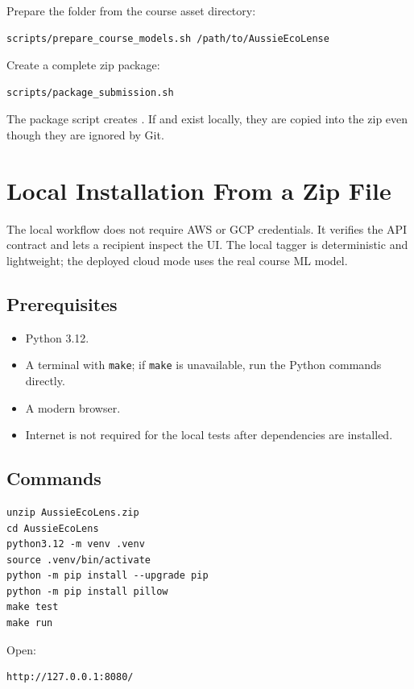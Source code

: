 \documentclass[12pt,a4paper]{article}
\begin{document}
Prepare the folder from the course asset directory:

\begin{verbatim}
scripts/prepare_course_models.sh /path/to/AussieEcoLense
\end{verbatim}

Create a complete zip package:

\begin{verbatim}
scripts/package_submission.sh
\end{verbatim}

The package script creates . If  and  exist locally, they are copied into the zip even though they are ignored by Git.

\section{Local Installation From a Zip File}
The local workflow does not require AWS or GCP credentials. It verifies the API contract and lets a recipient inspect the UI. The local tagger is deterministic and lightweight; the deployed cloud mode uses the real course ML model.

\subsection{Prerequisites}
\begin{itemize}
  \item Python 3.12.
  \item A terminal with \texttt{make}; if \texttt{make} is unavailable, run the Python commands directly.
  \item A modern browser.
  \item Internet is not required for the local tests after dependencies are installed.
\end{itemize}

\subsection{Commands}
\begin{verbatim}
unzip AussieEcoLens.zip
cd AussieEcoLens
python3.12 -m venv .venv
source .venv/bin/activate
python -m pip install --upgrade pip
python -m pip install pillow
make test
make run
\end{verbatim}

Open:
\begin{verbatim}
http://127.0.0.1:8080/
\end{verbatim}
\end{document}
